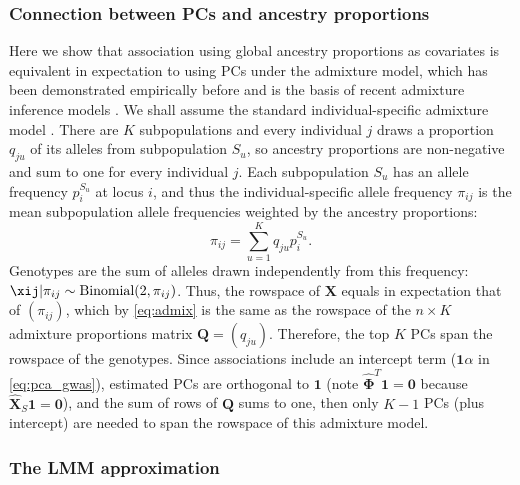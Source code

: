 \documentclass[11pt]{article}
\begin{document}
\subsubsection{Connection between PCs and ancestry proportions}

Here we show that association using global ancestry proportions as covariates is equivalent in expectation to using PCs under the admixture model, which has been demonstrated empirically before \citep{alexander_fast_2009, zhou_strong_2016} and is the basis of recent admixture inference models \citep{zheng_eigenanalysis_2016,cabreros_likelihood-free_2019}.
We shall assume the standard individual-specific admixture model \citep{pritchard_inference_2000, alexander_fast_2009}.
There are $K$ subpopulations and every individual $j$ draws a proportion $q_{ju}$ of its alleles from subpopulation $S_u$, so ancestry proportions are non-negative and sum to one for every individual $j$.
Each subpopulation $S_u$ has an allele frequency $p_i^{S_u}$ at locus $i$, and thus the individual-specific allele frequency $\pi_{ij}$ is the mean subpopulation allele frequencies weighted by the ancestry proportions:
\begin{equation}
  \label{eq:admix}
  \pi_{ij} = \sum_{u=1}^K q_{ju} p_i^{S_u}.
\end{equation}
Genotypes are the sum of alleles drawn independently from this frequency: $\xij | \pi_{ij} \sim \text{Binomial}(2, \pi_{ij})$.
Thus, the rowspace of $\mathbf{X}$ equals in expectation that of $(\pi_{ij})$, which by \cref{eq:admix} is the same as the rowspace of the $n \times K$ admixture proportions matrix $\mathbf{Q} = (q_{ju})$.
Therefore, the top $K$ PCs span the rowspace of the genotypes.
Since associations include an intercept term ($\mathbf{1} \alpha$ in \cref{eq:pca_gwas}), estimated PCs are orthogonal to $\mathbf{1}$ (note $\mathbf{\hat{\Phi}}^T \mathbf{1} = \mathbf{0}$ because $\mathbf{\hat{X}}_S \mathbf{1} = \mathbf{0}$), and the sum of rows of $\mathbf{Q}$ sums to one, then only $K-1$ PCs (plus intercept) are needed to span the rowspace of this admixture model.

\subsubsection{The LMM approximation}
\end{document}
